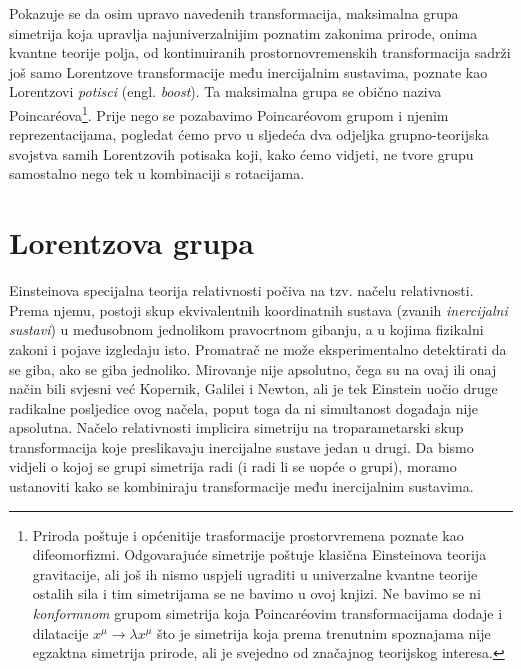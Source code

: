 Pokazuje se da osim upravo navedenih transformacija, maksimalna
grupa simetrija koja upravlja najuniverzalnijim poznatim zakonima
prirode, onima kvantne teorije polja, od kontinuiranih prostornovremenskih
transformacija sadrži još samo Lorentzove transformacije među inercijalnim sustavima,
poznate kao Lorentzovi \emph{potisci} (engl. \emph{boost}).
Ta maksimalna grupa se obično naziva Poincar\'{e}ova\footnote{Priroda poštuje
    i općenitije trasformacije prostorvremena poznate kao difeomorfizmi. 
     
    Odgovarajuće simetrije poštuje klasična Einsteinova teorija gravitacije, ali još
    ih nismo uspjeli ugraditi u univerzalne kvantne teorije ostalih sila i
    tim simetrijama se ne bavimo u ovoj knjizi. Ne bavimo se ni \emph{konformnom}
    grupom simetrija koja Poincar\'{e}ovim transformacijama dodaje i
    dilatacije $x^{\mu}\to\lambda x^{\mu}$   što je simetrija koja prema
    trenutnim spoznajama nije egzaktna simetrija prirode,
    ali je svejedno od značajnog teorijskog interesa.}.
Prije nego se pozabavimo Poincar\'{e}ovom grupom i njenim reprezentacijama,
pogledat ćemo prvo u sljedeća dva odjeljka grupno-teorijska svojstva samih
Lorentzovih potisaka koji, kako ćemo vidjeti, ne tvore grupu samostalno
nego tek u kombinaciji s rotacijama.


\section{Lorentzova grupa}
\label{sec:lorentz}

Einsteinova specijalna teorija relativnosti počiva na tzv.
načelu relativnosti. Prema njemu, postoji skup ekvivalentnih koordinatnih
sustava (zvanih \emph{inercijalni sustavi})
 
u međusobnom jednolikom pravocrtnom gibanju, a u kojima fizikalni zakoni i pojave
izgledaju isto. Promatrač ne može eksperimentalno detektirati da 
se giba, ako se giba jednoliko. Mirovanje nije apsolutno,
čega su na ovaj ili onaj način bili svjesni već Kopernik, Galilei i Newton, ali je
tek Einstein uočio druge radikalne posljedice ovog načela, poput toga
da ni simultanost događaja nije apsolutna.
Načelo relativnosti implicira simetriju na troparametarski skup transformacija
koje preslikavaju inercijalne sustave jedan u drugi.
Da bismo vidjeli o kojoj se grupi simetrija radi (i radi li se uopće o grupi),
moramo ustanoviti kako se kombiniraju transformacije među inercijalnim sustavima.

